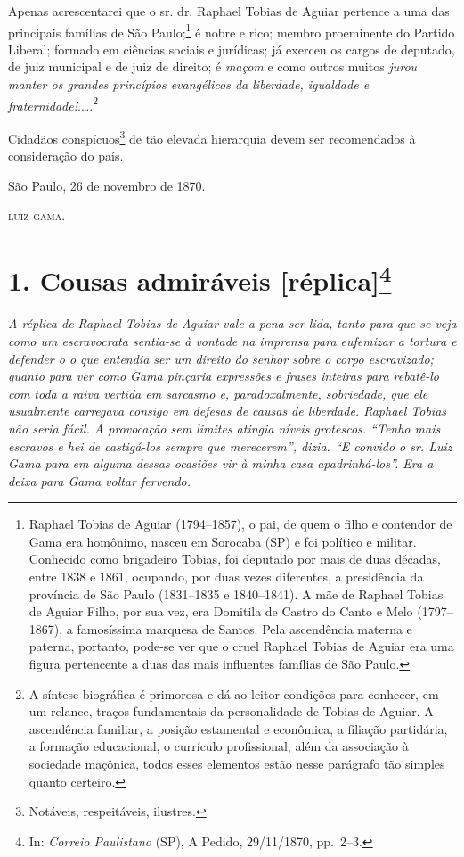 {Apenas acrescentarei que o sr. dr. Raphael Tobias de Aguiar pertence a
uma das principais famílias de São Paulo;\footnote{ Raphael Tobias de
  Aguiar (1794--1857), o pai, de quem o filho e contendor de Gama era
  homônimo, nasceu em Sorocaba (SP) e foi político e militar. Conhecido
  como brigadeiro Tobias, foi deputado por mais de duas décadas, entre
  1838 e 1861, ocupando, por duas vezes diferentes, a presidência da
  província de São Paulo (1831--1835 e 1840--1841). A mãe de Raphael
  Tobias de Aguiar Filho, por sua vez, era Domitila de Castro do Canto e
  Melo (1797--1867), a famosíssima marquesa de Santos. Pela ascendência
  materna e paterna, portanto, pode-se ver que o cruel Raphael Tobias de
  Aguiar era uma figura pertencente a duas das mais influentes famílias
  de São Paulo.} é nobre e rico; membro proeminente do Partido Liberal;
formado em ciências sociais e jurídicas; já exerceu os cargos de
deputado, de juiz municipal e de juiz de direito; é \emph{maçom} e como
outros muitos \emph{jurou manter os grandes princípios evangélicos da
liberdade, igualdade e fraternidade!}.\ldots.\footnote{ A síntese
  biográfica é primorosa e dá ao leitor condições para conhecer, em um
  relance, traços fundamentais da personalidade de Tobias de Aguiar. A
  ascendência familiar, a posição estamental e econômica, a filiação
  partidária, a formação educacional, o currículo profissional, além da
  associação à sociedade maçônica, todos esses elementos estão nesse
  parágrafo tão simples quanto certeiro.}

Cidadãos conspícuos\footnote{ Notáveis, respeitáveis, ilustres.} de
tão elevada hierarquia devem ser recomendados à consideração do país.
\begin{flushright}
São Paulo, 26 de novembro de 1870.

\textsc{luiz gama}.
\end{flushright}

\chapter{1. Cousas admiráveis {[}réplica{]}\footnote{ In: \emph{Correio Paulistano} (SP), A Pedido, 29/11/1870,
  pp.~2--3.}} %

\begin{didascalia}
\emph{A réplica de Raphael Tobias de Aguiar vale a pena ser lida, tanto
para que se veja como um escravocrata sentia-se à vontade na imprensa
para eufemizar a tortura e defender o o que entendia ser um direito do
senhor sobre o corpo escravizado; quanto para ver como Gama pinçaria
expressões e frases inteiras para rebatê-lo com toda a raiva vertida em
sarcasmo e, paradoxalmente, sobriedade, que ele usualmente carregava
consigo em defesas de causas de liberdade. Raphael Tobias não seria
fácil. A provocação sem limites atingia níveis grotescos. ``Tenho mais
escravos e hei de castigá-los sempre que merecerem'', dizia. ``E convido o
sr. Luiz Gama para em alguma dessas ocasiões vir à minha casa
apadrinhá-los''. Era a deixa para Gama voltar fervendo.}
\end{didascalia}

}
